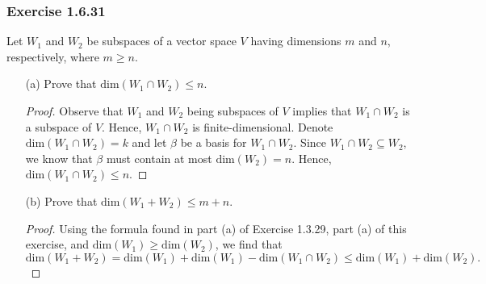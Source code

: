 \subsubsection{Exercise 1.6.31} Let \( W_{1}  \) and \( W_{2}  \) be subspaces of a vector space \( V  \) having dimensions \( m  \) and \( n \), respectively, where \( m \geq n \).
\begin{enumerate}
    \item[(a)] Prove that \( \text{dim}(W_{1} \cap W_{2}) \leq n \).
        \begin{proof}
            Observe that \( W_{1} \) and \( W_{2} \) being subspaces of \( V  \) implies that \( W_{1} \cap W_{2}  \) is a subspace of \( V  \). Hence, \( W_{1} \cap W_{2} \) is finite-dimensional. Denote \( \text{dim}(W_{1} \cap W_{2}) = k  \) and let \( \beta \) be a basis for \( W_{1} \cap W_{2}  \). Since \( W_{1} \cap W_{2} \subseteq W_{2} \), we know that \( \beta \) must contain at most \( \text{dim}(W_{2}) =  n  \). Hence, \( \text{dim}(W_{1} \cap W_{2}) \leq n  \).
        \end{proof}
    \item[(b)] Prove that \( \text{dim}(W_{1} + W_{2}) \leq m + n  \).
        \begin{proof}
        Using the formula found in part (a) of Exercise 1.3.29, part (a) of this exercise, and \( \text{dim}(W_{1}) \geq \text{dim}(W_{2}) \), we find that 
        \[ \text{dim}(W_{1} + W_{2}) = \text{dim}(W_{1}) + \text{dim}(W_{1}) - \text{dim}(W_{1} \cap W_{2}) \leq \text{dim}(W_{1}) + \text{dim}(W_{2}). \]
        \end{proof}
\end{enumerate}


